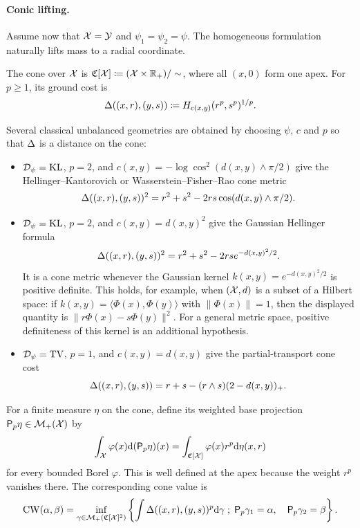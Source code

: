 \paragraph{Conic lifting.}

Assume now that $\mathcal{X}=\mathcal{Y}$ and $\psi_1=\psi_2=\psi$. The homogeneous formulation naturally lifts mass to a radial coordinate.
\begin{defn}\label{def-unbalanced-cone-lift}
The cone over $\mathcal{X}$ is $\mathfrak C[\mathcal{X}]\coloneqq(\mathcal{X}\times\mathbb{R}_+)/\sim$, where all $(x,0)$ form one apex. For $p\geq1$, its ground cost is
\[
	\Delta((x,r),(y,s))\coloneqq H_{c(x,y)}(r^p,s^p)^{1/p}.
\]
\end{defn}
Several classical unbalanced geometries are obtained by choosing $\psi$, $c$ and $p$ so that $\Delta$ is a distance on the cone:
\begin{itemize}
	\item $\mathcal{D}_\psi=\operatorname{KL}$, $p=2$, and $c(x,y)=-\log\cos^2(d(x,y)\wedge\pi/2)$ give the Hellinger--Kantorovich or Wasserstein--Fisher--Rao cone metric
	\[
		\Delta((x,r),(y,s))^2=r^2+s^2-2rs\cos(d(x,y)\wedge\pi/2).
	\]
	\item $\mathcal{D}_\psi=\operatorname{KL}$, $p=2$, and $c(x,y)=d(x,y)^2$ give the Gaussian Hellinger formula
	\[
		\Delta((x,r),(y,s))^2=r^2+s^2-2rs e^{-d(x,y)^2/2}.
	\]
	It is a cone metric whenever the Gaussian kernel $k(x,y)=e^{-d(x,y)^2/2}$ is positive definite. This holds, for example, when $(\mathcal{X},d)$ is a subset of a Hilbert space: if $k(x,y)=\langle\Phi(x),\Phi(y)\rangle$ with $\|\Phi(x)\|=1$, then the displayed quantity is $\|r\Phi(x)-s\Phi(y)\|^2$. For a general metric space, positive definiteness of this kernel is an additional hypothesis.
	\item $\mathcal{D}_\psi=\operatorname{TV}$, $p=1$, and $c(x,y)=d(x,y)$ give the partial-transport cone cost
	\[
		\Delta((x,r),(y,s))=r+s-(r\wedge s)(2-d(x,y))_+.
	\]
\end{itemize}
For a finite measure $\eta$ on the cone, define its weighted base projection
$\mathsf P_p\eta\in\mathcal{M}_+(\mathcal{X})$ by
\[
	\int_{\mathcal{X}}\varphi(x)\mathrm{d}(\mathsf P_p\eta)(x)
	=
	\int_{\mathfrak C[\mathcal{X}]}\varphi(x)r^p\mathrm{d}\eta(x,r)
\]
for every bounded Borel $\varphi$. This is well defined at the apex because
the weight $r^p$ vanishes there. The corresponding cone value is
\[
	\operatorname{CW}(\alpha,\beta)
	=
	\inf_{\gamma\in\mathcal{M}_+(\mathfrak C[\mathcal{X}]^2)}
	\left\{
	\int \Delta((x,r),(y,s))^p\mathrm{d}\gamma
	\; ; \;
	\mathsf P_p\gamma_1=\alpha,\quad
	\mathsf P_p\gamma_2=\beta
	\right\}.
\]

